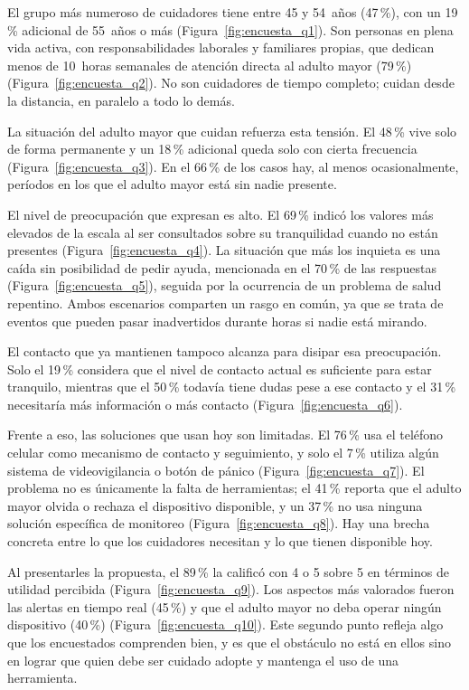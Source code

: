 El grupo más numeroso de cuidadores tiene entre 45 y 54~años (47\,\%), con un 19\,\% adicional de 55~años o más (Figura~\ref{fig:encuesta_q1}).
Son personas en plena vida activa, con responsabilidades laborales y familiares propias, que dedican menos de 10~horas semanales de atención directa al adulto mayor (79\,\%) (Figura~\ref{fig:encuesta_q2}).
No son cuidadores de tiempo completo; cuidan desde la distancia, en paralelo a todo lo demás.

La situación del adulto mayor que cuidan refuerza esta tensión.
El 48\,\% vive solo de forma permanente y un 18\,\% adicional queda solo con cierta frecuencia (Figura~\ref{fig:encuesta_q3}).
En el 66\,\% de los casos hay, al menos ocasionalmente, períodos en los que el adulto mayor está sin nadie presente.

El nivel de preocupación que expresan es alto.
El 69\,\% indicó los valores más elevados de la escala al ser consultados sobre su tranquilidad cuando no están presentes (Figura~\ref{fig:encuesta_q4}).
La situación que más los inquieta es una caída sin posibilidad de pedir ayuda, mencionada en el 70\,\% de las respuestas (Figura~\ref{fig:encuesta_q5}), seguida por la ocurrencia de un problema de salud repentino.
Ambos escenarios comparten un rasgo en común, ya que se trata de eventos que pueden pasar inadvertidos durante horas si nadie está mirando.

El contacto que ya mantienen tampoco alcanza para disipar esa preocupación.
Solo el 19\,\% considera que el nivel de contacto actual es suficiente para estar tranquilo, mientras que el 50\,\% todavía tiene dudas pese a ese contacto y el 31\,\% necesitaría más información o más contacto (Figura~\ref{fig:encuesta_q6}).

Frente a eso, las soluciones que usan hoy son limitadas.
El 76\,\% usa el teléfono celular como mecanismo de contacto y seguimiento, y solo el 7\,\% utiliza algún sistema de videovigilancia o botón de pánico (Figura~\ref{fig:encuesta_q7}).
El problema no es únicamente la falta de herramientas; el 41\,\% reporta que el adulto mayor olvida o rechaza el dispositivo disponible, y un 37\,\% no usa ninguna solución específica de monitoreo (Figura~\ref{fig:encuesta_q8}).
Hay una brecha concreta entre lo que los cuidadores necesitan y lo que tienen disponible hoy.

Al presentarles la propuesta, el 89\,\% la calificó con 4 o 5 sobre 5 en términos de utilidad percibida (Figura~\ref{fig:encuesta_q9}).
Los aspectos más valorados fueron las alertas en tiempo real (45\,\%) y que el adulto mayor no deba operar ningún dispositivo (40\,\%) (Figura~\ref{fig:encuesta_q10}).
Este segundo punto refleja algo que los encuestados comprenden bien, y es que el obstáculo no está en ellos sino en lograr que quien debe ser cuidado adopte y mantenga el uso de una herramienta.

